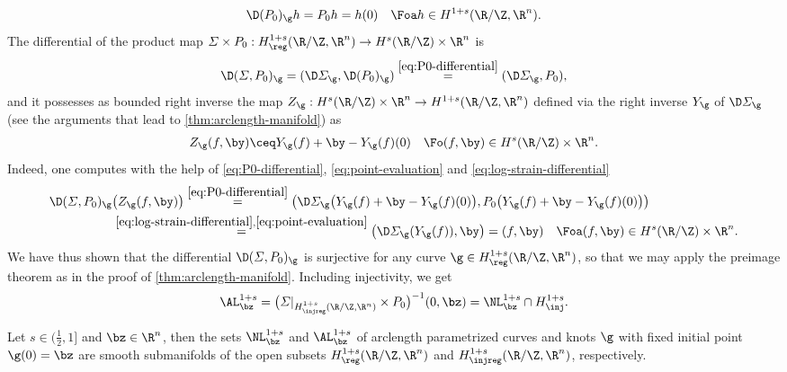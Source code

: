 \begin{equation}\label{eq:P0-differential}
\D(P_0)_\g h=P_0 h=h(0)\quad\Foa h\in H^{1+s}(\R/\Z,\R^n).
\end{equation}
The differential of the product map $\varSigma\times P_0:
H^{1+s}_\reg(\R/\Z,\R^n)\to H^s(\R/\Z)\times\R^n$ is
$$
\D(\varSigma,P_0)_\g=(\D\varSigma_\g,\D(P_0)_\g)
\overset{\cref{eq:P0-differential}}{=}(\D\varSigma_\g,P_0),
$$
 and it possesses as bounded right
inverse the map $Z_\g:H^s(\R/\Z)\times\R^n\to H^{1+s}(\R/\Z,\R^n)$
defined via the right inverse $Y_\g$ of $\D\varSigma_\g$ (see the arguments that lead to
\cref{thm:arclength-manifold}) as
\begin{align*}
	Z_\g(f,\by) \ceq Y_\g(f)+\by-Y_\g(f)(0)\quad\Fo (f,\by)\in
H^s(\R/\Z)\times\R^n.
\end{align*}
Indeed, one computes with the help of \cref{eq:P0-differential}, 
\cref{eq:point-evaluation} and
\cref{eq:log-strain-differential}
\begin{align*}
	\D(\varSigma,P_0)_\g & \big(Z_\g(f,\by)\big)
	\overset{\cref{eq:P0-differential}}{=}
	\big(\D\varSigma_\g
	\big(Y_\g(f)+\by-Y_\g(f)(0)\big),P_0\big(Y_\g(f)+\by-
	Y_\g(f)(0)\big)\big)\\
	&\overset{\cref{eq:log-strain-differential},\cref{eq:point-evaluation}}{=}
	\big(\D\varSigma_\g(Y_\g(f)),\by\big)=(f,\by)\quad\Foa (f,\by)
	\in H^s(\R/\Z)\times\R^n.
\end{align*}
We have thus shown that the differential $\D(\varSigma,P_0)_\g$ is surjective
for any curve $\g\in H^{1+s}_\reg(\R/\Z,\R^n)$, so that we may apply the
preimage theorem as in the proof of \cref{thm:arclength-manifold}.
Including injectivity, we get 
\begin{equation}\label{eq:AL_z-preimage}
	\AL^{1+s}_\bz=\big(
	\varSigma|_{H^{1+s}_\injreg(\R/\Z,\R^n)}\times P_0\big)^{-1}(0,\bz)=\NL^{1+s}_{\bz}\cap H^{1+s}_{\inj}.
\end{equation}

\begin{theorem}
\label{thm:arclength-manifold-point}
Let $s\in (\frac{1}{2},1]$ and $\bz\in\R^n$, then the sets $\NL^{1+s}_\bz$ and 
$\AL^{1+s}_\bz$
of arclength parametrized curves and knots $\g$ with fixed initial point $\g(0)=\bz$ are
smooth submanifolds of the open subsets $H^{1+s}_\reg(\R/\Z,\R^n)$ and $ H^{1+s}_{\injreg}(\R/\Z,\R^n) $, respectively. 
\end{theorem}

